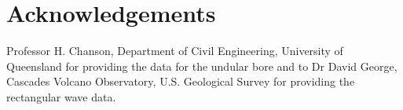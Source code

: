 \documentclass[SingleSpace,12pt]{Serre_ASCE}
\begin{document}
\section{Acknowledgements}

Professor H. Chanson, Department of Civil Engineering, University of Queensland for providing the data for the undular bore and to Dr David George, Cascades Volcano Observatory, U.S. Geological Survey for providing the rectangular wave data.


\end{document}

